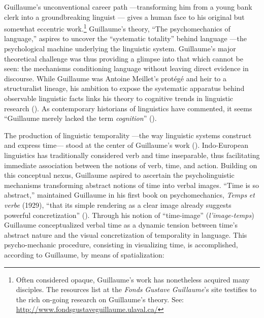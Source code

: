 \documentclass[output=paper]{langsci/langscibook}
\begin{document}
Guillaume’s unconventional career path —transforming him from a young bank clerk into a groundbreaking linguist \citep{valin_histoire_1982}— gives a human face to his original but somewhat eccentric work.\footnote{Often considered opaque, Guillaume’s work has nonetheless acquired many disciples. The resources list at the \textit{Fonds} \textit{Gustave} \textit{Guillaume}’s site testifies to the rich on-going research on Guillaume’s theory. See: \url{http://www.fondsgustaveguillaume.ulaval.ca/}}  Guillaume’s theory, “The psychomechanics of language,” aspires to uncover the “systematic totality” \citep[15]{guillaume_larchitectonique_1965} behind language —the psychological machine underlying the linguistic system. Guillaume’s major theoretical challenge was thus providing a glimpse into that which cannot be seen: the mechanisms conditioning language without leaving direct evidence in discourse. While Guillaume was Antoine Meillet’s protégé and heir to a structuralist lineage, his ambition to expose the systematic apparatus behind observable linguistic facts links his theory to cognitive trends in linguistic research (\citealt{puech_mentalisme_1997}). As contemporary historians of linguistics have commented, it seems “Guillaume merely lacked the term \textit{cognition}” (\citealt[41]{bottineau_terminologie_2006}). 

The production of linguistic temporality —the way linguistic systems construct and express time— stood at the center of Guillaume’s work (\citealt{joly_problemes_1980}). Indo\nobreakdash-European linguistics has traditionally considered verb and time inseparable, thus facilitating immediate association between the notions of verb, time, and action. Building on this conceptual nexus, Guillaume aspired to ascertain the psycholinguistic mechanisms transforming abstract notions of time into verbal images. “Time is so abstract,” maintained Guillaume in his first book on psychomechanics, \textit{Temps} \textit{et} \textit{verbe} (1929), “that its simple rendering as a clear image already suggests powerful concretization” (\citealt[7]{guillaume_temps_1965}). Through his notion of “time-image” (\textit{l’image-temps}) Guillaume conceptualized verbal time as a dynamic tension between time’s abstract nature and the visual concretization of temporality in language. This psycho-mechanic procedure, consisting in visualizing time, is accomplished, according to Guillaume, by means of spatialization:
\end{document}
